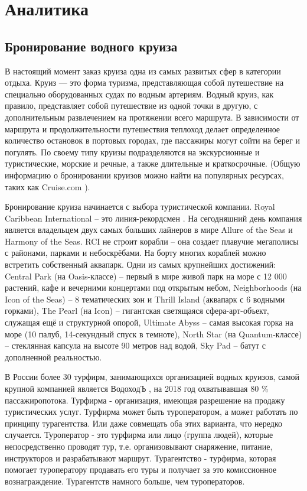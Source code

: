 \documentclass[11pt,a4paper,final]{article}
\begin{document}
\newpage
\section {Аналитика}
\subsection{Бронирование водного круиза}

 {\par В настоящий момент заказ круиза одна из самых развитых сфер в категории отдыха. Круиз — это форма туризма, представляющая собой путешествие на специально оборудованных судах по водным артериям. Водный круиз, как правило, представляет собой путешествие из одной точки в другую, с дополнительным развлечением на протяжении всего маршрута. В зависимости от маршрута и продолжительности путешествия теплоход делает определенное количество остановок в портовых городах, где пассажиры могут сойти на берег и погулять. По своему типу круизы подразделяются на экскурсионные и туристические, морские и речные, а также длительные и краткосрочные. (Общую информацию о бронировании круизов можно найти на популярных ресурсах, таких как Cruise.com \cite{Cruise.com}). 
 
 Бронирование круиза начинается с выбора туристической компании. Royal Caribbean International – это линия-рекордсмен \cite{Royal}. На сегодняшний день компания является владельцем двух самых больших лайнеров в мире Allure of the Seas и Harmony of the Seas. RCI не строит корабли – она создает плавучие мегаполисы с районами, парками и небоскрёбами. На борту многих кораблей можно встретить собственный аквапарк. Одни из самых крупнейших достижений: Central Park (на Oasis-классе) – первый в мире живой парк на море с 12 000 растений, кафе и вечерними концертами под открытым небом, Neighborhoods (на Icon of the Seas) – 8 тематических зон и Thrill Island (аквапарк с 6 водными горками), The Pearl (на Icon) – гигантская светящаяся сфера-арт-объект, служащая ещё и структурной опорой, Ultimate Abyss – самая высокая горка на море (10 палуб, 14-секундный спуск в темноте), North Star (на Quantum-классе) – стеклянная капсула на высоте 90 метров над водой, Sky Pad – батут с дополненной реальностью.
 
 В России более 30 турфирм, занимающихся организацией водных круизов, самой крупной компанией является ВодоходЪ \cite{vodohod}, на 2018 год охватывавшая 80 $\%$ пассажиропотока. Турфирма - организация, имеющая разрешение на продажу туристических услуг. Турфирма может быть туроператором, а может работать по принципу турагентства. Или даже совмещать оба этих варианта, что нередко случается. Туроператор - это турфирма или лицо (группа людей), которые непосредственно проводят тур, т.е. организовывают снаряжение, питание, инструкторов и разрабатывают маршрут. Турагентство - турфирма, которая помогает туроператору продавать его туры и получает за это комиссионное вознаграждение. Турагентств намного больше, чем туроператоров.
 
}
\end{document}
